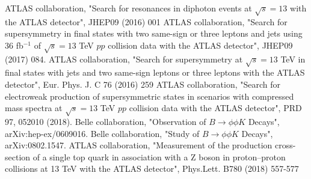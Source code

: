 \documentclass[12pt]{article}
\begin{document}
\begin{thebibliography}{999}
 ATLAS collaboration, "Search for resonances in diphoton events at $\sqrt{s} = 13$ with the ATLAS detector", JHEP09 (2016) 001
 ATLAS collaboration, "Search for supersymmetry in final states with two same-sign or three leptons and jets using 36 fb$^{-1}$ of $\sqrt{s} = 13$ TeV $pp$ collision data with the ATLAS detector", JHEP09 (2017) 084.
 ATLAS collaboration, "Search for supersymmetry at $\sqrt{s} = 13$ TeV in final states with jets and two same-sign leptons or three leptons with the ATLAS detector", Eur. Phys. J. C 76 (2016) 259
 ATLAS collaboration, "Search for electroweak production of supersymmetric states in scenarios with compressed mass spectra at $\sqrt{s} = 13$ TeV $pp$ collision data with the ATLAS detector", PRD 97, 052010 (2018).
 Belle collaboration, "Observation of $B \to \phi \phi K$ Decays", arXiv:hep-ex/0609016.
 Belle collaboration, "Study of $B \to \phi \phi K$ Decays", arXiv:0802.1547.
ATLAS collaboration, "Measurement of the production cross-section of a single top quark in association with a Z boson in proton–proton collisions at 13 TeV with the ATLAS detector", Phys.Lett. B780 (2018) 557-577
\end{thebibliography}
\end{document}
